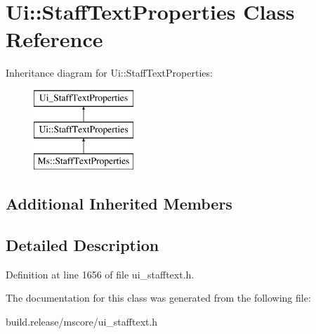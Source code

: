 \hypertarget{class_ui_1_1_staff_text_properties}{}\section{Ui\+:\+:Staff\+Text\+Properties Class Reference}
\label{class_ui_1_1_staff_text_properties}
Inheritance diagram for Ui\+:\+:Staff\+Text\+Properties\+:\begin{figure}[H]
\begin{center}
\leavevmode
\includegraphics[height=3.000000cm]{class_ui_1_1_staff_text_properties}
\end{center}
\end{figure}
\subsection*{Additional Inherited Members}


\subsection{Detailed Description}


Definition at line 1656 of file ui\+\_\+stafftext.\+h.



The documentation for this class was generated from the following file\+:\begin{DoxyCompactItemize}
\item 
build.\+release/mscore/ui\+\_\+stafftext.\+h\end{DoxyCompactItemize}

